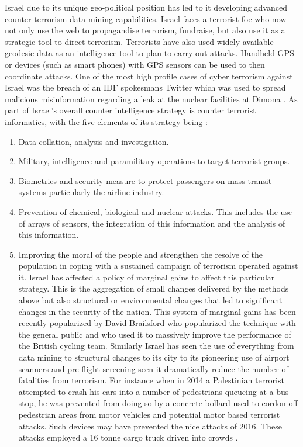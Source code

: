 Israel due to its unique geo-political position has led to it developing advanced counter terrorism data mining capabilities. Israel faces a terrorist foe who now not only use the web to propagandise terrorism, fundraise,  but also use it as a strategic tool to direct terrorism. Terrorists have also used widely available geodesic data as an intelligence tool to plan to carry out attacks. Handheld GPS or devices (such as smart phones) with GPS sensors can be used to then coordinate attacks. One of the most high profile cases of cyber terrorism against Israel was the breach of an IDF  spokesmans Twitter which was used to spread  malicious misinformation regarding a leak at the nuclear facilities at Dimona \citep{Israeltwitterhack}.
As part of Israel's overall counter intelligence strategy is counter terrorist informatics, with the five elements of its strategy being \citep{tucker2003strategies}:
\begin{enumerate}
	\item Data collation, analysis and investigation.
	\item Military, intelligence and paramilitary operations to target terrorist groups.
	\item Biometrics and security measure to protect passengers on mass transit systems particularly the airline industry.
	\item Prevention of chemical, biological and nuclear attacks. This includes the use of arrays of sensors, the integration of this information and the analysis of this information.
	\item Improving the moral of the people and strengthen the resolve of the population in coping with a sustained campaign of terrorism operated against it. Israel has affected a policy of marginal gains to affect this particular strategy. This is the aggregation of small changes delivered by the methods above but also structural or environmental changes that led to significant changes in the security of the nation. This system of marginal gains has been recently popularized by David Brailsford who popularized the technique with the general public \citep{durrand2014pre} and who used it to massively improve the performance of the British cycling team. Similarly Israel has seen the use of everything from data mining to structural changes to its city to its pioneering use of airport scanners and pre flight screening seen it dramatically reduce the number of fatalities from terrorism. For instance when in 2014 a Palestinian terrorist attempted to crash his cars into a number of pedestrians queueing at a bus stop, he was prevented from doing so by a concrete bollard \citep{Israelcounterterrorismlesson}  used to cordon off pedestrian areas from motor vehicles and potential motor based terrorist attacks. Such devices may have prevented the nice attacks of 2016. These attacks employed a 16 tonne cargo truck driven into crowds \citep{nesser2016jihadi}. 
\end{enumerate}


